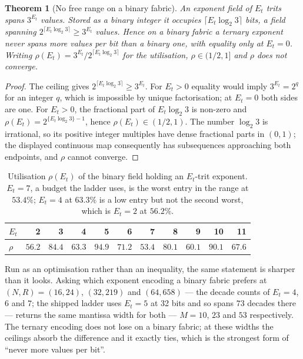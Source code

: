 \documentclass[11pt]{article}
\newtheorem{theorem}{Theorem}
\theoremstyle{definition}
\begin{document}
\begin{theorem}[No free range on a binary fabric]
\label{thm:nofree}
An exponent field of $E_t$ trits spans $3^{E_t}$ values. Stored as a binary
integer it occupies $\lceil E_t\log_2 3\rceil$ bits, a field spanning
$2^{\lceil E_t\log_2 3\rceil} \geq 3^{E_t}$ values. Hence on a binary fabric a
ternary exponent never spans more values per bit than a binary one, with equality
only at $E_t = 0$. Writing $\rho(E_t) = 3^{E_t}/2^{\lceil E_t\log_2 3\rceil}$ for
the utilisation, $\rho \in (1/2, 1]$ and $\rho$ does not converge.
\end{theorem}
\begin{proof}
The ceiling gives $2^{\lceil E_t\log_2 3\rceil}\geq3^{E_t}$.  For
$E_t>0$ equality would imply $3^{E_t}=2^q$ for an integer $q$, which is
impossible by unique factorisation; at $E_t=0$ both sides are one.  For
$E_t>0$, the fractional part of $E_t\log_2 3$ is non-zero and
$\rho(E_t)=2^{\{E_t\log_2 3\}-1}$, hence $\rho(E_t)\in(1/2,1)$.  The number
$\log_2 3$ is irrational, so its positive integer multiples have dense
fractional parts in $(0,1)$; the displayed continuous map consequently has
subsequences approaching both endpoints, and $\rho$ cannot converge.
\end{proof}

\begin{table}[t]\centering
\caption{Utilisation $\rho(E_t)$ of the binary field holding an $E_t$-trit
exponent. $E_t = 7$, a budget the ladder uses, is the worst entry in the range at
$53.4\%$; $E_t = 4$ at $63.3\%$ is a low entry but not the second worst, which is
$E_t = 2$ at $56.2\%$.}
\label{tab:rho}
\begin{tabular}{lrrrrrrrrrr}
\toprule
$E_t$ & 2 & 3 & 4 & 5 & 6 & 7 & 8 & 9 & 10 & 11 \\
\midrule
$\rho$ & $56.2$ & $84.4$ & $\mathbf{63.3}$ & $94.9$ & $71.2$ & $\mathbf{53.4}$ & $80.1$ & $60.1$ & $90.1$ & $67.6$ \\
\bottomrule
\end{tabular}
\end{table}

Run as an optimisation rather than an inequality, the same statement is sharper
than it looks. Asking which exponent encoding a binary fabric prefers at
$(N, R) = (16, 24)$, $(32, 219)$ and $(64, 658)$ --- the decade counts of
$E_t = 4$, $6$ and $7$; the shipped ladder uses $E_t = 5$ at 32 bits and so spans
$73$ decades there --- returns the same mantissa width
for both --- $M = 10$, $23$ and $53$ respectively. The ternary encoding does not
lose on a binary fabric; at these widths the ceilings absorb the difference and it
exactly ties, which is the strongest form of ``never more values per bit''.
\end{document}
